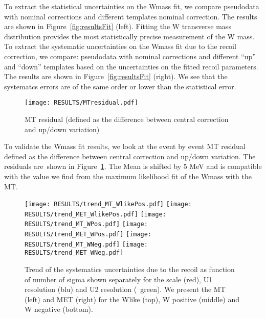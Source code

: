 To extract the statistical uncertainties on the Wmass fit, we compare
pseudodata with nominal corrections and different templates nominal correction.
The results are shown in Figure~\ref{fig:resultsFit} (left).
Fitting the W transverse mass distribution provides the most statistically precise measurement of the W mass.
To extract the systematic uncertainties on the Wmass fit due to the recoil correction, we compare:
pseudodata with nominal corrections and different “up” and “down” templates based on the uncertainties on the fitted recoil parameters.
The results are shown in Figure~\ref{fig:resultsFit} (right).
We see that the systematcs errors are of the same order or lower than the statistical error.

\begin{figure}[h!]
  \begin{center}
    \texttt{[image: RESULTS/MTresidual.pdf]}
    \caption{
     MT residual (defined as the difference between central correction and up/down variation)
    }
    \label{fig:mtResidual}
  \end{center}
\end{figure}

To validate the Wmass fit results, we look at the event by event MT residual defined as the difference between central correction and up/down variation. The residuals are\
 shown in Figure~\ref{fig:mtResidual}.
The Mean is shifted by 5 MeV and is compatible with the value we find from the maximum likelihood fit of the Wmass with the MT.

\begin{figure}[h!]
  \begin{center}
    \texttt{[image: RESULTS/trend\_MT\_WlikePos.pdf]}
    \texttt{[image: RESULTS/trend\_MET\_WlikePos.pdf]}
    \texttt{[image: RESULTS/trend\_MT\_WPos.pdf]}
    \texttt{[image: RESULTS/trend\_MET\_WPos.pdf]}
    \texttt{[image: RESULTS/trend\_MT\_WNeg.pdf]}
    \texttt{[image: RESULTS/trend\_MET\_WNeg.pdf]}
    \caption{
     Trend of the systematics uncertainties due to the recoil as function of number of sigma shown separately for the scale (red), U1 resolution (blu) and U2 resolution (\
green).
     We present the MT (left) and MET (right) for the Wlike (top), W positive (middle) and W negative (bottom).
    }
    \label{fig:uncScan}
  \end{center}
\end{figure}

